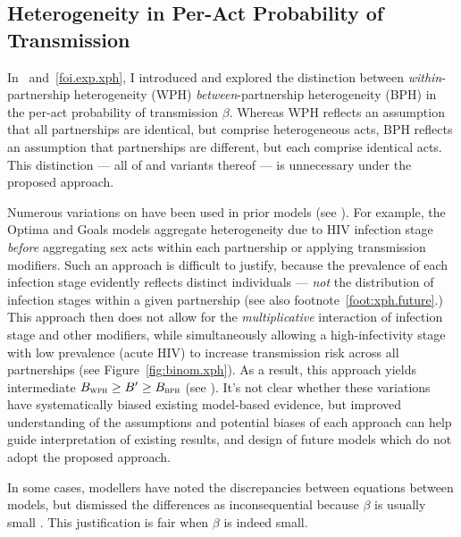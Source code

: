 \subsection{Heterogeneity in Per-Act Probability of Transmission}\label{foi.disc.xph}
In ~and~\ref{foi.exp.xph}, I introduced and explored the distinction between
\emph{within}-partnership heterogeneity (WPH) \vs \emph{between}-partnership heterogeneity (BPH)
in the per-act probability of transmission $\beta$. Whereas
WPH reflects an assumption that all partnerships are identical, but comprise heterogeneous acts,
BPH reflects an assumption that partnerships are different, but each comprise identical acts.
This distinction --- \ie all of  and variants thereof ---
is unnecessary under the proposed approach.
\par
Numerous variations on  have been used in prior models
(see ).
For example, the Optima \cite{Kerr2015} and Goals \cite{Stover2014} models
aggregate heterogeneity due to HIV infection stage
\emph{before} aggregating sex acts within each partnership or applying transmission modifiers.
Such an approach is difficult to justify, because
the prevalence of each infection stage evidently reflects distinct individuals
--- \emph{not} the distribution of infection stages within a given partnership
(see also footnote~\ref{foot:xph.future}.)
This approach then does not allow for
the \emph{multiplicative} interaction of infection stage and other modifiers,
while simultaneously allowing a high-infectivity stage with low prevalence (\eg acute HIV)
to increase transmission risk across all partnerships (see Figure~\ref{fig:binom.xph}).
As a result, this approach yields intermediate $B_{\textsc{wph}} \ge B' \ge B_{\textsc{bph}}$
(see ).
It's not clear whether these variations have systematically biased existing model-based evidence,
but improved understanding of the assumptions and potential biases of each approach
can help guide interpretation of existing results,
and design of future models which do not adopt the proposed approach.
\par
In some cases, modellers have noted the discrepancies between equations between models,
but dismissed the differences as inconsequential because $\beta$ is usually small
\cite{Kerr2015}. %
This justification is fair when $\beta$ is indeed small.
